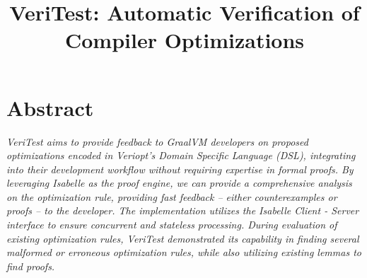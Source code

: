\documentclass[conference,a4paper,english,10pt]{IEEEtran}[2015/08/26]
\begin{document}

\title{\Large \textbf{VeriTest: Automatic Verification of Compiler Optimizations}}

\begin{large}
\author{%
}
\end{large}


\maketitle

%
%
\iffalse
  \IEEEoverridecommandlockouts
  \IEEEpubid{\begin{minipage}{\textwidth}\ \\[12pt] \centering
      1551-3203 \copyright 2015 IEEE.
      Personal use is permitted, but republication/redistribution requires IEEE permission.
      \\
      See \url{https://www.ieee.org/publications_standards/publications/rights/index.html} for more information.
    \end{minipage}}
\fi

\section*{\centering \textbf{Abstract}}
\begin{sublargesize}
  \textit{
    VeriTest aims to provide feedback to GraalVM developers on proposed optimizations encoded in Veriopt's Domain Specific Language (DSL),
    integrating into their development workflow without requiring expertise in formal proofs. By leveraging Isabelle as the proof engine, 
    we can provide a comprehensive analysis on the optimization rule, providing fast feedback -- either counterexamples or proofs -- to the developer. 
    The implementation utilizes the Isabelle Client - Server interface to ensure concurrent and stateless processing.
    During evaluation of existing optimization rules, VeriTest demonstrated its capability in finding several malformed or erroneous optimization 
    rules, while also utilizing existing lemmas to find proofs.
  }
\end{sublargesize}
\end{document}
